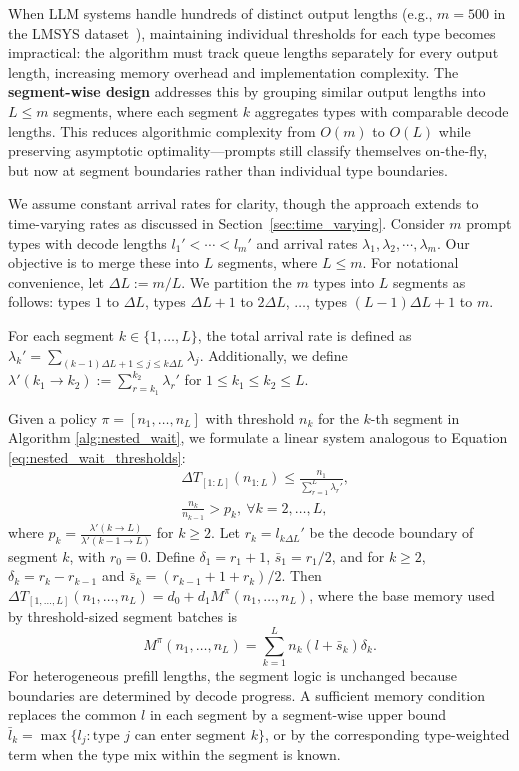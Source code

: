 When LLM systems handle hundreds of distinct output lengths (e.g., $m=500$ in the LMSYS dataset~\cite{zheng2023lmsys}), maintaining individual thresholds for each type becomes impractical: the algorithm must track queue lengths separately for every output length, increasing memory overhead and implementation complexity. The \textbf{segment-wise design} addresses this by grouping similar output lengths into $L \leq m$ segments, where each segment $k$ aggregates types with comparable decode lengths. This reduces algorithmic complexity from $O(m)$ to $O(L)$ while preserving asymptotic optimality—prompts still classify themselves on-the-fly, but now at segment boundaries rather than individual type boundaries.

We assume constant arrival rates for clarity, though the approach extends to time-varying rates as discussed in Section~\ref{sec:time_varying}. Consider $m$ prompt types with decode lengths $l_1' < \cdots < l_m'$ and arrival rates $\lambda_1, \lambda_2, \cdots, \lambda_m$. Our objective is to merge these into $L$ segments, where $L \leq m$. For notational convenience, let $\Delta L:= m/L$. We partition the $m$ types into $L$ segments as follows: types $1$ to $\Delta L$, types $\Delta L+ 1$ to $2\Delta L$, $\dots$, types $(L-1)\Delta L+ 1$ to $m$.

For each segment $k \in \{1, \dots, L\}$, the total arrival rate is defined as $\lambda_k' = \sum_{(k-1)\Delta L+1\le j\le k\Delta L} \lambda_j$. Additionally, we define $\lambda'(k_1 \to k_2) := \sum_{r=k_1}^{k_2} \lambda_r'$ for $1 \leq k_1 \leq k_2 \leq L$.

Given a policy $\pi=[n_1,\dots,n_L]$ with threshold $n_k$ for the $k$-th segment in Algorithm \ref{alg:nested_wait}, we formulate a linear system analogous to Equation \eqref{eq:nested_wait_thresholds}:
\begin{equation}          \label{eq:nested_wait_thresholds_L}
    \begin{aligned}
    &\Delta T_{[1:L]}(n_{1:L}) \leq \frac{n_1}{\sum_{r=1}^L \lambda_r'},  \\
    &\frac{n_k}{n_{k-1}} > p_k, \ \forall k=2,\dots,L,
    \end{aligned}
\end{equation}
where $p_k =\frac{\lambda'(k \to L)}{\lambda'(k-1 \to L)}$ for \(k\ge2\). Let \(r_k=l_{k\Delta L}'\) be the decode boundary of segment \(k\), with \(r_0=0\). Define \(\delta_1=r_1+1\), \(\bar s_1=r_1/2\), and for \(k\ge2\), \(\delta_k=r_k-r_{k-1}\) and \(\bar s_k=(r_{k-1}+1+r_k)/2\). Then \(\Delta T_{[1,\dots,L]}(n_1,\dots,n_L) = d_0 + d_1 M^\pi(n_1, \dots, n_L)\), where the base memory used by threshold-sized segment batches is
\[
M^{\pi}(n_1, \dots, n_L) = \sum_{k=1}^L n_k (l+\bar s_k)\delta_k.
\]
For heterogeneous prefill lengths, the segment logic is unchanged because boundaries are determined by decode progress. A sufficient memory condition replaces the common \(l\) in each segment by a segment-wise upper bound \(\bar l_k=\max\{l_j: \text{type }j\text{ can enter segment }k\}\), or by the corresponding type-weighted term when the type mix within the segment is known.

